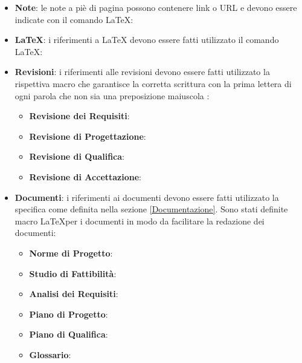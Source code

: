 \documentclass[12pt,a4paper]{article}
\begin{document}
\begin{itemize}
  \item \textbf{Note}: le note a piè di pagina possono contenere link o URL e devono essere indicate con il comando \LaTeX: 
  \item \textbf{\LaTeX}: i riferimenti a \LaTeX{} devono essere fatti utilizzato il comando \LaTeX: 
  \item \textbf{Revisioni}: i riferimenti alle revisioni devono essere fatti utilizzato la rispettiva macro che garantisce la corretta scrittura con la prima lettera di ogni parola che non sia una preposizione maiuscola :
  \begin{itemize}
    \item \textbf{Revisione dei Requisiti}: 
    \item \textbf{Revisione di Progettazione}: 
    \item \textbf{Revisione di Qualifica}: 
    \item \textbf{Revisione di Accettazione}: 
  \end{itemize}
  \item \textbf{Documenti}: i riferimenti ai documenti devono essere fatti utilizzato la specifica come definita nella sezione \ref{Documentazione}. Sono stati definite macro  \LaTeX per i documenti in modo da facilitare la redazione dei documenti:
  \begin{itemize}
    \item \textbf{Norme di Progetto}: 
    \item \textbf{Studio di Fattibilità}: 
    \item \textbf{Analisi dei Requisiti}: 
    \item \textbf{Piano di Progetto}: 
    \item \textbf{Piano di Qualifica}: 
    \item \textbf{Glossario}: 
  \end{itemize}
\end{itemize}
\end{document}
